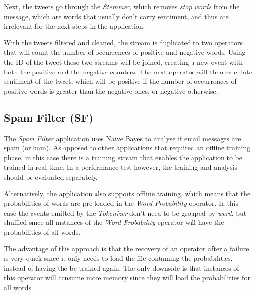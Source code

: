 \documentclass[ppgc,diss,english]{iiufrgs}
\begin{document}
Next, the tweets go through the \emph{Stemmer}, which removes \emph{stop words} from the message, which are words that usually don't carry sentiment, and thus are irrelevant for the next steps in the application.

With the tweets filtered and cleaned, the stream is duplicated to two operators that will count the number of occurrences of positive and negative words. Using the ID of the tweet these two streams will be joined, creating a new event with both the positive and the negative counters. The next operator will then calculate sentiment of the tweet, which will be positive if the number of occurrences of positive words is greater than the negative ones, or negative otherwise.


\subsection{Spam Filter (SF)}

The \emph{Spam Filter} application uses Naive Bayes \cite{androutsopoulos2000evaluation} to analyse if email messages are spam (or ham). As opposed to other applications that required an offline training phase, in this case there is a training stream that enables the application to be trained in real-time. In a performance test however, the training and analysis should be evaluated separately.

Alternatively, the application also supports offline training, which means that the probabilities of words are pre-loaded in the \emph{Word Probability} operator. In this case the events emitted by the \emph{Tokenizer} don't need to be grouped by \emph{word}, but shuffled since all instances of the \emph{Word Probability} operator will have the probabilities of all words.

The advantage of this approach is that the recovery of an operator after a failure is very quick since it only needs to load the file containing the probabilities, instead of having the be trained again. The only downside is that instances of this operator will consume more memory since they will load the probabilities for all words.
\end{document}
